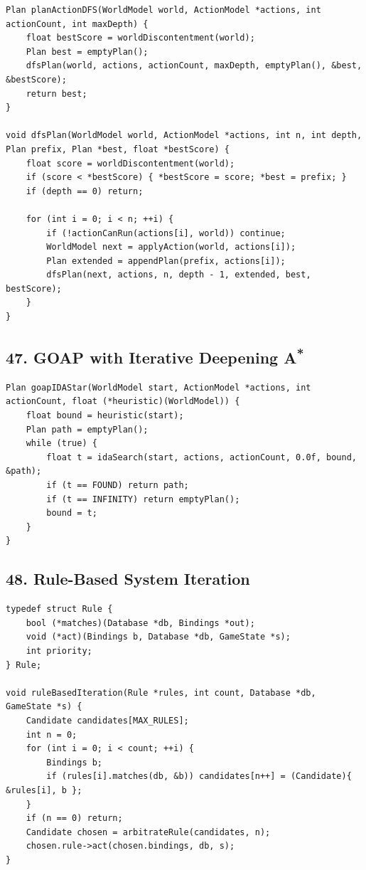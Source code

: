 \documentclass[10pt,letterpaper]{article}
\begin{document}
\begin{verbatim}
Plan planActionDFS(WorldModel world, ActionModel *actions, int actionCount, int maxDepth) {
    float bestScore = worldDiscontentment(world);
    Plan best = emptyPlan();
    dfsPlan(world, actions, actionCount, maxDepth, emptyPlan(), &best, &bestScore);
    return best;
}

void dfsPlan(WorldModel world, ActionModel *actions, int n, int depth, Plan prefix, Plan *best, float *bestScore) {
    float score = worldDiscontentment(world);
    if (score < *bestScore) { *bestScore = score; *best = prefix; }
    if (depth == 0) return;

    for (int i = 0; i < n; ++i) {
        if (!actionCanRun(actions[i], world)) continue;
        WorldModel next = applyAction(world, actions[i]);
        Plan extended = appendPlan(prefix, actions[i]);
        dfsPlan(next, actions, n, depth - 1, extended, best, bestScore);
    }
}
\end{verbatim}

\subsection*{47. GOAP with Iterative Deepening \texorpdfstring{A\textsuperscript{*}}{A*}}
{}

\begin{verbatim}
Plan goapIDAStar(WorldModel start, ActionModel *actions, int actionCount, float (*heuristic)(WorldModel)) {
    float bound = heuristic(start);
    Plan path = emptyPlan();
    while (true) {
        float t = idaSearch(start, actions, actionCount, 0.0f, bound, &path);
        if (t == FOUND) return path;
        if (t == INFINITY) return emptyPlan();
        bound = t;
    }
}
\end{verbatim}

\subsection*{48. Rule-Based System Iteration}
{}

\begin{verbatim}
typedef struct Rule {
    bool (*matches)(Database *db, Bindings *out);
    void (*act)(Bindings b, Database *db, GameState *s);
    int priority;
} Rule;

void ruleBasedIteration(Rule *rules, int count, Database *db, GameState *s) {
    Candidate candidates[MAX_RULES];
    int n = 0;
    for (int i = 0; i < count; ++i) {
        Bindings b;
        if (rules[i].matches(db, &b)) candidates[n++] = (Candidate){ &rules[i], b };
    }
    if (n == 0) return;
    Candidate chosen = arbitrateRule(candidates, n);
    chosen.rule->act(chosen.bindings, db, s);
}
\end{verbatim}
\end{document}
